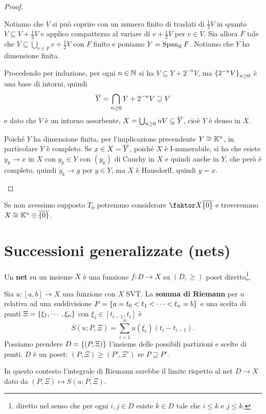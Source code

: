 \begin{proof}
\begin{itemize}
Notiamo che $V$ si pu\`o coprire con un numero finito di traslati di $\frac12 V$ in quanto $V\subseteq V+\frac12V$ e applico compattezza al variare di $v+\frac12V$ per $v\in V$. Sia allora $F$ tale che $V\subseteq\bigcup_{v\in F}v+\frac12V$ con $F$ finito e poniamo $Y=\operatorname{Span}_{\mathbb{K}} F$. Notiamo che $Y$ ha dimensione finita.

Procedendo per induzione, per ogni $n\in\mathbb{N}$ si ha $V\subseteq Y+2^{-n}V$, ma $\left\{{2^{-n}V}\right\}_{n\geq0}$ \`e una base di intorni, quindi 
\[\overline{Y}=\bigcap_{n\geq 0}Y+2^{-n}V\supseteq V\]
e dato che $V$ \`e un intorno assorbente, $X=\bigcup_{n\geq 0}nV\subseteq \overline{Y}$, cio\`e $Y$ \`e denso in $X$.

Poich\'e $Y$ ha dimensione finita, per l'implicazione precendente $Y\cong \mathbb{K}^n$, in particolare $Y$ \`e completo. Se $x\in X=\overline{Y}$, poich\'e $X$ \`e I-numerabile, si ha che esiste $y_k\to x$ in $X$ con $y_k\in Y$ con $(y_k)$ di Cauchy in $X$ e quindi anche in $Y$, che per\`o \`e completo, quindi $y_k\to y$ per $y\in Y$, ma $X$ \`e Hausdorff, quindi $y=x$.
\end{itemize}
\setlength{\leftmargini}{0.5cm}
\end{proof}

\begin{remark}
Se non avessimo supposto $T_0$ potremmo considerare $\quot X{\ol{\cpa0}}$ e troveremmo $X\cong \mathbb{K}^n\oplus \overline{\left\{{0}\right\}}$.
\end{remark}


\section{Successioni generalizzate (nets)}
\begin{definition}[Net]
Un \textbf{net} su un insieme $X$ \`e una funzione $f:D\to X$ su $(D,\geq)$ poset diretto\footnote{diretto nel senso che per ogni $i,j\in D$ esiste $k\in D$ tale che $i\leq k$ e $j\leq k$.}.
\end{definition}

\begin{example}
Sia $u:[a,b]\to X$ una funzione con $X$ SVT. La \textbf{somma di Riemann} per $u$ relativa ad una suddivisione $P=\left\{{a=t_0<t_1<\cdots<t_n=b}\right\}$ e una scelta di punti $\Xi=\left\{{\xi_1,\cdots, \xi_n}\right\}$ con $\xi_i\in [t_{i-1},t_i]$ \`e
\[S(u;P,\Xi)=\sum_{i=1}^nu(\xi_i)(t_i-t_{i-1}).\]
Possiamo prendere $D=\left\{{(P,\Xi)}\right\}$ l'insieme delle possibili partizioni e scelte di punti. $D$ \`e un poset: $(P,\Xi)\geq (P',\Xi')$ se $P\supseteq P'$.

In questo contesto l'integrale di Riemann sarebbe il limite rispetto al net $D\to X$ dato da $(P,\Xi)\mapsto S(u;P,\Xi)$.
\end{example}

